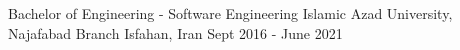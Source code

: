 
\begin{cventries}

  \cventry
    {Bachelor of Engineering - Software Engineering} %
    {Islamic Azad University, Najafabad Branch} %
    {Isfahan, Iran} %
    {Sept 2016 - June 2021} %
    {
      \begin{cvitems} %
      \end{cvitems}
    }

\end{cventries}
